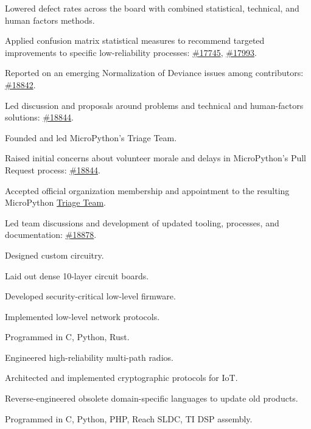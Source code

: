 \begin{tightemize}
  \item Lowered defect rates across the board with combined statistical, technical, and human factors methods.
  \begin{tightemize}
    \item Applied confusion matrix statistical measures to recommend targeted improvements to specific low-reliability processes:
      \href{https://github.com/micropython/micropython/pull/17745}{\#17745},
      \href{https://github.com/micropython/micropython/pull/17993}{\#17993}.
    \item Reported on an emerging Normalization of Deviance issues among contributors:
      \href{https://github.com/micropython/micropython/pull/18842#issuecomment-3929430580}{\#18842}.
    \item Led discussion and proposals around problems and technical and human-factors solutions:
      \href{https://github.com/orgs/micropython/discussions/18844}{\#18844}.
  \end{tightemize}
  \item Founded and led MicroPython's Triage Team.
  \begin{tightemize}
    \item Raised initial concerns about volunteer morale and delays in MicroPython's Pull Request process:
      \href{https://github.com/orgs/micropython/discussions/18844}{\#18844}.
    \item Accepted official organization membership and appointment
      to the resulting MicroPython \href{https://github.com/orgs/micropython/teams/triage-team}{Triage Team}.
    \item Led team discussions and development of updated tooling, processes, and documentation:
      \href{https://github.com/orgs/micropython/discussions/18878}{\#18878}.
  \end{tightemize}
\end{tightemize}

\subsectionsep

\begin{tightemize}
    \item Designed custom circuitry.
    \item Laid out dense 10-layer circuit boards.
    \item Developed security-critical low-level firmware.
    \item Implemented low-level network protocols.
    \item Programmed in C, Python, Rust.
    \item Engineered high-reliability multi-path radios.
    \item Architected and implemented cryptographic protocols for IoT.
    \item Reverse-engineered obsolete domain-specific languages to update old products.
    \item Programmed in C, Python, PHP, Reach SLDC, TI DSP assembly.
\end{tightemize}
\subsectionsep

